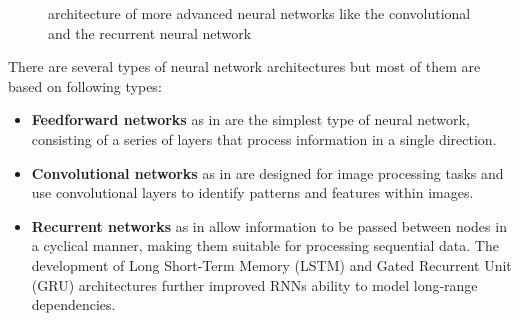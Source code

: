 \begin{figure}
    \begin{center}
        \hfill
    \end{center}
    \caption[advanced neural network architectures]{architecture of more advanced neural networks like the convolutional and the recurrent neural network}
    \label{fig:neural_network-architecture}
\end{figure}

There are several types of neural network architectures but most of them are based on following types: 
\begin{itemize}
	\item \textbf{Feedforward networks} \cite{DL_FeedForward} as in  are the simplest type of neural network, consisting of a series of layers that process information in a single direction.
	\item \textbf{Convolutional networks} \cite{DL_ConvNetwork} as in  are designed for image processing tasks and use convolutional layers to identify patterns and features within images. 
	\item \textbf{Recurrent networks} \cite{DL_RecurrentNetwork} as in allow information to be passed between nodes in a cyclical manner, making them suitable for processing sequential data. The development of Long Short-Term Memory (LSTM) and Gated Recurrent Unit (GRU) architectures further improved RNNs ability to model long-range dependencies.
\end{itemize}

